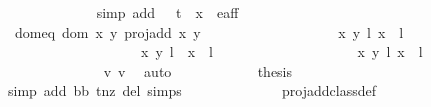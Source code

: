 \begin{isabellebody}
\ \ \ \ \ \ \ \ \ \ \ \ \isamarkupfalse%
{\isacharparenleft}simp\ add{\isacharcolon}\ {\isacartoucheopen}{\isacharparenleft}{}\ {\isacharslash}\ {\isacharparenleft}t\ {\isacharasterisk}\ x{\isacharprime}{\isacharparenright}{\isacharcomma}{}{\isacharparenright}\ {\isasymnotin}\ e{\isacharunderscore}aff{\isacartoucheclose}{\isacharparenright}\isanewline
\ \ \ \ \ \ \ \ \ \ \isamarkupfalse%
\ dom{\isacharunderscore}eq{\isacharcolon}\ {\isachardoublequoteopen}{\isacharparenleft}dom\ {\isacharparenleft}{\isasymlambda}{\isacharparenleft}x{\isacharcomma}\ y{\isacharparenright}{\isachardot}\ proj{\isacharunderscore}add\ x\ y{\isacharparenright}\ {\isasyminter}\isanewline
\ \ \ \ \ \ \ \ \ \ \ \ \ \ \ \ \ \ {\isacharbraceleft}{\isacharparenleft}{\isacharparenleft}{\isacharparenleft}x{\isacharcomma}\ y{\isacharparenright}{\isacharcomma}\ l{\isacharparenright}{\isacharcomma}\ {\isacharparenleft}x{\isacharprime}{\isacharcomma}\ {}{\isacharparenright}{\isacharcomma}\ l{\isacharprime}{\isacharparenright}{\isacharcomma}\isanewline
\ \ \ \ \ \ \ \ \ \ \ \ \ \ \ \ \ \ \ {\isacharparenleft}{\isacharparenleft}{\isacharparenleft}x{\isacharcomma}\ y{\isacharparenright}{\isacharcomma}\ l{\isacharparenright}{\isacharcomma}\ {\isasymtau}\ {\isacharparenleft}x{\isacharprime}{\isacharcomma}\ {}{\isacharparenright}{\isacharcomma}\ l{\isacharprime}\ {\isacharplus}\ {}{\isacharparenright}{\isacharbraceright}{\isacharparenright}\ {\isacharequal}\ \isanewline
\ \ \ \ \ \ \ \ \ \ \ \ \ \ \ \ {\isacharbraceleft}{\isacharparenleft}{\isacharparenleft}{\isacharparenleft}x{\isacharcomma}\ y{\isacharparenright}{\isacharcomma}\ l{\isacharparenright}{\isacharcomma}\ {\isacharparenleft}x{\isacharprime}{\isacharcomma}\ {}{\isacharparenright}{\isacharcomma}\ l{\isacharprime}{\isacharparenright}{\isacharbraceright}{\isachardoublequoteclose}\ \isanewline
\ \ \ \ \ \ \ \ \ \ \ \ \isamarkupfalse%
\ v{}\ v{}\ \isamarkupfalse%
\ auto\isanewline
\ \ \ \ \ \ \ \ \ \ \isamarkupfalse%
\ {\isacharquery}thesis\ \isanewline
\ \ \ \ \ \ \ \ \ \ \ \ \isamarkupfalse%
\ {}\ \isamarkupfalse%
{\isacharparenleft}simp\ add{\isacharcolon}\ bb\ t{\isacharunderscore}nz\ del{\isacharcolon}\ {\isasymtau}{\isachardot}simps{\isacharparenright}\isanewline
\ \ \ \ \ \ \ \ \ \ \ \ \isamarkupfalse%
\ proj{\isacharunderscore}add{\isacharunderscore}class{\isacharunderscore}def\ \isamarkupfalse%

\end{isabellebody}
